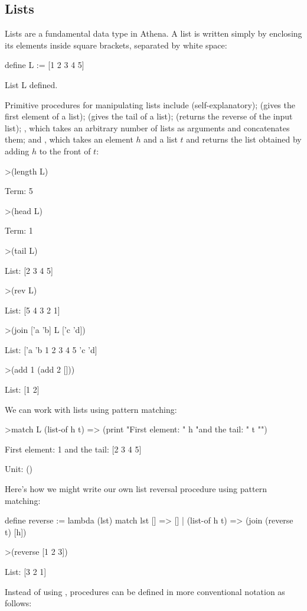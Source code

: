 \subsection{Lists}
Lists are a fundamental data type in Athena. A list is written simply by enclosing its elements inside square brackets, separated by white space:
\begin{tcAthena}[upquote=true]
define L := [1 2 3 4 5]

List L defined.
\end{tcAthena}
Primitive procedures for manipulating lists include  (self-explanatory);  (gives the first element of a list); 
 (gives the tail of a list);  (returns the reverse of the input list); , which takes an arbitrary
number of lists as arguments and concatenates them; and , which takes an element $h$ and a list $t$ and returns the list
obtained by adding $h$ to the front of $t$: 
\begin{tcAthena}[upquote=true]
>(length L)

Term: 5

>(head L)

Term: 1

>(tail L)

List: [2 3 4 5]

>(rev L)

List: [5 4 3 2 1]

>(join ['a 'b] L ['c 'd])

List: ['a 'b 1 2 3 4 5 'c 'd]

>(add 1 (add 2 []))

List: [1 2]
\end{tcAthena}
We can work with lists using pattern matching:
\begin{tcAthena}
>match L {
   (list-of h t) => (print "First element: " h "and the tail: " t "\n")
 }

First element: 1 and the tail: [2 3 4 5] 

Unit: ()
\end{tcAthena}
Here's how we might write our own list reversal procedure using pattern matching: 
\begin{tcAthena}
define reverse := 
  lambda (lst)
    match lst  {
      [] => []
    | (list-of h t) => (join (reverse t) [h])
    }

>(reverse [1 2 3])

List: [3 2 1]
\end{tcAthena}
Instead of using , procedures can be defined in more conventional notation as follows:
